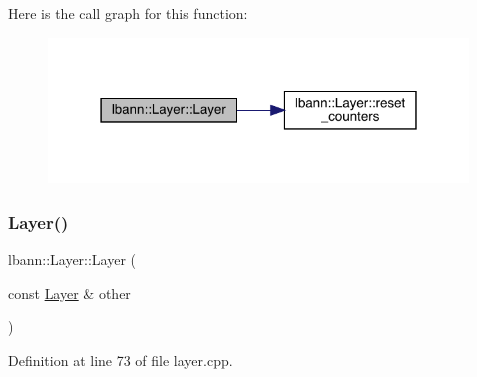 Here is the call graph for this function\+:\nopagebreak
\begin{figure}[H]
\begin{center}
\leavevmode
\includegraphics[width=316pt]{classlbann_1_1Layer_a24e9c82354a0a2af1b70cbca2211e7d4_cgraph}
\end{center}
\end{figure}
\mbox{\label{classlbann_1_1Layer_a247cc68c730284f10a2cb42985fe5f3a}} 
\subsubsection{\texorpdfstring{Layer()}{Layer()}\hspace{0.1cm}{\footnotesize\ttfamily [2/2]}}
{\footnotesize\ttfamily lbann\+::\+Layer\+::\+Layer (\begin{DoxyParamCaption}\item[{const \hyperlink{classlbann_1_1Layer}{Layer} \&}]{other }\end{DoxyParamCaption})}



Definition at line 73 of file layer.\+cpp.


